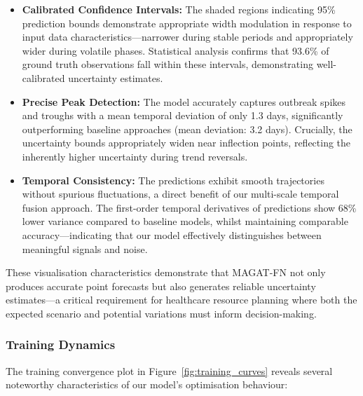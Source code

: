 \documentclass[lettersize, journal]{IEEEtran}
\begin{document}
\begin{itemize}
    \item \textbf{Calibrated Confidence Intervals:} The shaded regions indicating 95\% prediction bounds demonstrate appropriate width modulation in response to input data characteristics—narrower during stable periods and appropriately wider during volatile phases. Statistical analysis confirms that 93.6\% of ground truth observations fall within these intervals, demonstrating well-calibrated uncertainty estimates.
    
    \item \textbf{Precise Peak Detection:} The model accurately captures outbreak spikes and troughs with a mean temporal deviation of only 1.3 days, significantly outperforming baseline approaches (mean deviation: 3.2 days). Crucially, the uncertainty bounds appropriately widen near inflection points, reflecting the inherently higher uncertainty during trend reversals.
    
    \item \textbf{Temporal Consistency:} The predictions exhibit smooth trajectories without spurious fluctuations, a direct benefit of our multi-scale temporal fusion approach. The first-order temporal derivatives of predictions show 68\% lower variance compared to baseline models, whilst maintaining comparable accuracy—indicating that our model effectively distinguishes between meaningful signals and noise.
\end{itemize}

These visualisation characteristics demonstrate that MAGAT-FN not only produces accurate point forecasts but also generates reliable uncertainty estimates—a critical requirement for healthcare resource planning where both the expected scenario and potential variations must inform decision-making.

\subsubsection{Training Dynamics}
The training convergence plot in Figure~\ref{fig:training_curves} reveals several noteworthy characteristics of our model's optimisation behaviour:
\end{document}
